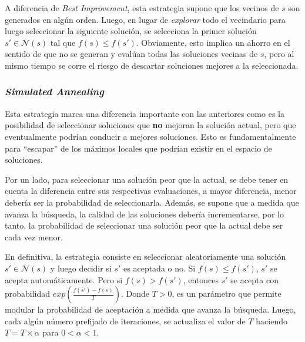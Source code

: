 A diferencia de \textit{Best Improvement}, esta estrategia supone que los
vecinos de $s$ son generados en alg\'un orden. Luego, en lugar de
\textit{explorar} todo el vecindario para luego seleccionar la
siguiente soluci\'on, se selecciona la primer soluci\'on $s' \in
\mathcal{N}(s)$ tal que $f(s) \leq f(s')$. Obviamente, esto implica un ahorro en
el sentido de que no se generan y eval\'uan todas las soluciones vecinas de $s$,
pero al mismo tiempo se corre el riesgo de descartar soluciones mejores a la
seleccionada.

\subsubsection{\textit{Simulated Annealing}}

Esta estrategia marca una diferencia importante con las anteriores como es la
posibilidad de seleccionar soluciones que \textbf{no} mejoran la soluci\'on
actual, pero que eventualmente podr\'ian conducir a mejores soluciones. Esto es
fundamentalmente para ``escapar'' de los m\'aximos locales que podr\'ian existir
en el espacio de soluciones. 

Por un lado, para seleccionar una soluci\'on peor que la actual, se debe tener
en cuenta la diferencia entre sus respectivas evaluaciones, a mayor diferencia,
menor deber\'ia ser la probabilidad de seleccionarla. Adem\'as, se supone que a
medida que avanza la b\'usqueda, la calidad de las soluciones deber\'ia
incrementarse, por lo tanto, la probabilidad de seleccionar una soluci\'on peor
que la actual debe ser cada vez menor.

En definitiva, la estrategia consiste en seleccionar aleatoriamente una
soluci\'on $s' \in \mathcal{N}(s)$ y luego decidir si $s'$ es aceptada o no.
Si $f(s) \leq f(s')$, $s'$ se acepta autom\'aticamente. Pero si $f(s) > f(s')$,
entonces $s'$ se acepta con probabilidad $exp(\frac{f(s') - f(s)}{T})$. Donde $T
> 0$, es un par\'ametro que permite modular la probabilidad de aceptaci\'on a
medida que avanza la b\'usqueda. Luego, cada alg\'un n\'umero prefijado de
iteraciones, se actualiza el valor de $T$ haciendo $T = T\times \alpha$ para $0
< \alpha < 1$.

